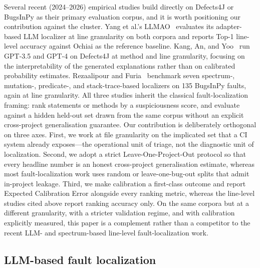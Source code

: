 \documentclass[preprint,12pt]{elsarticle}
\begin{document}
Several recent (2024--2026) empirical studies build directly on Defects4J or BugsInPy as their primary evaluation corpus, and it is worth positioning our contribution against the cluster. Yang et al.'s LLMAO~\cite{yang2024llmao} evaluates its adapter-based LLM localizer at line granularity on both corpora and reports Top-1 line-level accuracy against Ochiai as the reference baseline. Kang, An, and Yoo~\cite{kang2024llmfl} run GPT-3.5 and GPT-4 on Defects4J at method and line granularity, focusing on the interpretability of the generated explanations rather than on calibrated probability estimates. Rezaalipour and Furia~\cite{rezaalipour2024pyfl} benchmark seven spectrum-, mutation-, predicate-, and stack-trace-based localizers on 135 BugsInPy faults, again at line granularity. All three studies inherit the classical fault-localization framing: rank statements or methods by a suspiciousness score, and evaluate against a hidden held-out set drawn from the same corpus without an explicit cross-project generalisation guarantee. Our contribution is deliberately orthogonal on three axes. First, we work at file granularity on the implicated set that a CI system already exposes---the operational unit of triage, not the diagnostic unit of localization. Second, we adopt a strict Leave-One-Project-Out protocol so that every headline number is an honest cross-project generalisation estimate, whereas most fault-localization work uses random or leave-one-bug-out splits that admit in-project leakage. Third, we make calibration a first-class outcome and report Expected Calibration Error alongside every ranking metric, whereas the line-level studies cited above report ranking accuracy only. On the same corpora but at a different granularity, with a stricter validation regime, and with calibration explicitly measured, this paper is a complement rather than a competitor to the recent LLM- and spectrum-based line-level fault-localization work.

\subsection{LLM-based fault localization}
\end{document}

